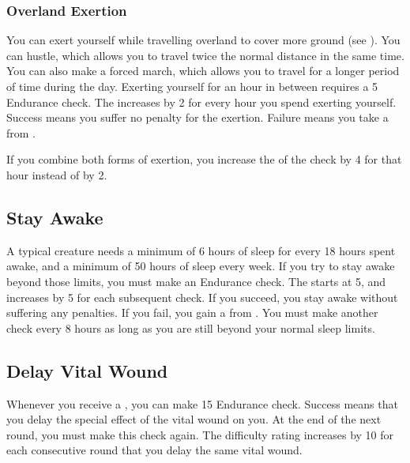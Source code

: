     \subsubsection{Overland Exertion}\label{Overland Exertion}
        You can exert yourself while travelling overland to cover more ground (see ).
        You can hustle, which allows you to travel twice the normal distance in the same time.
        You can also make a forced march, which allows you to travel for a longer period of time during the day.
        Exerting yourself for an hour in between  requires a  5 Endurance check.
        The  increases by 2 for every hour you spend exerting yourself.
        Success means you suffer no penalty for the exertion.
        Failure means you take a  from .

        If you combine both forms of exertion, you increase the  of the check by 4 for that hour instead of by 2.

    \subsection{Stay Awake}\label{Stay Awake}
        A typical creature needs a minimum of 6 hours of sleep for every 18 hours spent awake, and a minimum of 50 hours of sleep every week.
        If you try to stay awake beyond those limits, you must make an Endurance check.
        The  starts at 5, and increases by 5 for each subsequent check.
        If you succeed, you stay awake without suffering any penalties.
        If you fail, you gain a  from .
        You must make another check every 8 hours as long as you are still beyond your normal sleep limits.

    \subsection{Delay Vital Wound}\label{Delay Vital Wound}
        Whenever you receive a , you can make  15 Endurance check.
        Success means that you  delay the special effect of the vital wound on you.
        At the end of the next round, you must make this check again.
        The difficulty rating increases by 10 for each consecutive round that you delay the same vital wound.

